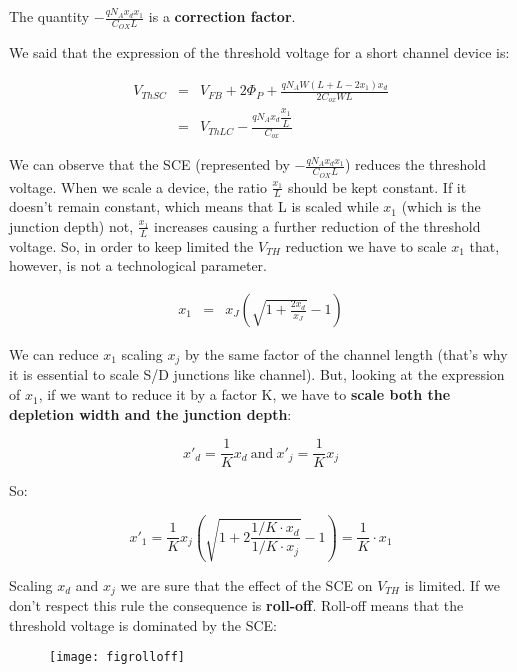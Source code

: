 \documentclass[a4paper, 12pt, twoside, openright]{report}
\begin{document}
The quantity $- \frac{q N_A x_d x_1}{C_{OX}L}$ is a \textbf{correction factor}.

We said that the expression of the threshold voltage  for a short channel device is:

	\begin{eqnarray*}
	   V_{ThSC}&=& V_{FB}+2\Phi_P+\frac{qN_AW\left(L+L-2x_1\right)x_d}{2 C_{ox}WL}\\
	           &=& V_{ThLC} - \frac{qN_A x_d \dfrac{x_1}{L}}{C_{ox}}
	\end{eqnarray*}

We can observe that the SCE (represented by $- \frac{q N_A x_d x_1}{C_{OX}L}$) reduces the threshold voltage. When we scale a device, the ratio $\frac{x_1}{L}$ should be kept constant. If it doesn't remain constant, which means that L is scaled while $x_{1}$ (which is the junction depth) not, $\frac{x_1}{L}$ increases causing a further reduction of the threshold voltage. So, in order to keep limited the $V_{TH}$ reduction we have to scale $x_{1}$ that, however, is not a technological parameter.

	\begin{eqnarray*}
	   x_1&=& x_J \left(\sqrt{1+\frac{2x_d}{x_J}} -1 \right)
	\end{eqnarray*}

We can reduce $x_{1}$ scaling $x_{j}$ by the same factor of the channel length (that's why it is essential to scale S/D junctions like channel). But, looking at the expression of $x_{1}$, if we want to reduce it by a factor K, we have to \textbf{scale both the depletion width and the junction depth}:

	\begin{equation}
	x'_d = \frac{1}{K} x_d\ \text{and}\ x'_j = \frac{1}{K} x_j
	\end{equation}

So:

	\begin{equation}
	x'_1 = \frac{1}{K} x_j \left( \sqrt{1+ 2\frac{1/K \cdot x_d}{1/K \cdot x_j}} - 1 \right) = \frac{1}{K} \cdot x_1
	\end{equation}

Scaling $x_{d}$ and $x_{j}$ we are sure that the effect of the SCE on $V_{TH}$ is limited. If we don't respect this rule the consequence is \textbf{roll-off}. Roll-off means that the threshold voltage is dominated by the SCE:

\newpage

	\begin{figure}[H]
	\centering
	\texttt{[image: figrolloff]}
	\caption{}
	\label{}
	\end{figure}
\end{document}
